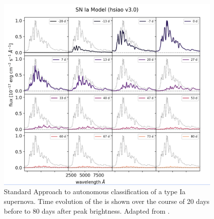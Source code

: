 \begin{figure}[t]
    \centering
    \includegraphics[width=.6\textwidth]{figures/desi_figures/snia_templates.png}
    \caption[Autonomous SNe Classification Templates]{Standard Approach to autonomous classification of 
    a type Ia supernova. Time evolution of the is shown over the course of 20 days before to 80 days after
    peak brightness. Adapted from \textcite{DESIpresentation}.}
    \label{fig:sne_template}
\end{figure}

